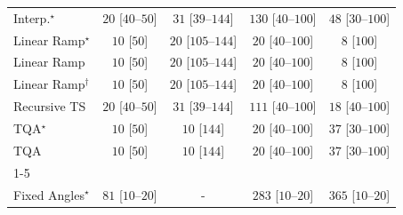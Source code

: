 \begin{tabular}{l|cccc|}
Interp.$^\star$ & {\cellcolor[HTML]{F5FBF2}} \color[HTML]{000000} $20$ [$40$--$50$] & {\cellcolor[HTML]{F3FAF0}} \color[HTML]{000000} $31$ [$39$--$144$] & {\cellcolor[HTML]{DFF3DA}} \color[HTML]{000000} $130$ [$40$--$100$] & {\cellcolor[HTML]{F0F9ED}} \color[HTML]{000000} $48$ [$30$--$100$] \\
Linear Ramp$^\star$ & {\cellcolor[HTML]{F7FCF5}} \color[HTML]{000000} $10$ [$50$] & {\cellcolor[HTML]{F5FBF2}} \color[HTML]{000000} $20$ [$105$--$144$] & {\cellcolor[HTML]{F5FBF2}} \color[HTML]{000000} $20$ [$40$--$100$] & {\cellcolor[HTML]{F7FCF5}} \color[HTML]{000000} $8$ [$100$] \\
Linear Ramp & {\cellcolor[HTML]{F7FCF5}} \color[HTML]{000000} $10$ [$50$] & {\cellcolor[HTML]{F5FBF2}} \color[HTML]{000000} $20$ [$105$--$144$] & {\cellcolor[HTML]{F5FBF2}} \color[HTML]{000000} $20$ [$40$--$100$] & {\cellcolor[HTML]{F7FCF5}} \color[HTML]{000000} $8$ [$100$] \\
Linear Ramp$^\dagger$ & {\cellcolor[HTML]{F7FCF5}} \color[HTML]{000000} $10$ [$50$] & {\cellcolor[HTML]{F5FBF2}} \color[HTML]{000000} $20$ [$105$--$144$] & {\cellcolor[HTML]{F5FBF2}} \color[HTML]{000000} $20$ [$40$--$100$] & {\cellcolor[HTML]{F7FCF5}} \color[HTML]{000000} $8$ [$100$] \\
Recursive TS & {\cellcolor[HTML]{F5FBF2}} \color[HTML]{000000} $20$ [$40$--$50$] & {\cellcolor[HTML]{F3FAF0}} \color[HTML]{000000} $31$ [$39$--$144$] & {\cellcolor[HTML]{E5F5E0}} \color[HTML]{000000} $111$ [$40$--$100$] & {\cellcolor[HTML]{F5FBF3}} \color[HTML]{000000} $18$ [$40$--$100$] \\
TQA$^\star$ & {\cellcolor[HTML]{F7FCF5}} \color[HTML]{000000} $10$ [$50$] & {\cellcolor[HTML]{F7FCF5}} \color[HTML]{000000} $10$ [$144$] & {\cellcolor[HTML]{F5FBF2}} \color[HTML]{000000} $20$ [$40$--$100$] & {\cellcolor[HTML]{F2FAEF}} \color[HTML]{000000} $37$ [$30$--$100$] \\
TQA & {\cellcolor[HTML]{F7FCF5}} \color[HTML]{000000} $10$ [$50$] & {\cellcolor[HTML]{F7FCF5}} \color[HTML]{000000} $10$ [$144$] & {\cellcolor[HTML]{F5FBF2}} \color[HTML]{000000} $20$ [$40$--$100$] & {\cellcolor[HTML]{F2FAEF}} \color[HTML]{000000} $37$ [$30$--$100$] \\
\cline{1-5}
\multicolumn{5}{c}{\rule{0pt}{8pt}SV} \\
\midrule
Fixed Angles$^\star$ & {\cellcolor[HTML]{EAF7E6}} \color[HTML]{000000} $81$ [$10$--$20$] & {\cellcolor[HTML]{000000}} \color[HTML]{F1F1F1} {\cellcolor{white}} \color{black} - & {\cellcolor[HTML]{ACDEA6}} \color[HTML]{000000} $283$ [$10$--$20$] & {\cellcolor[HTML]{8BCF89}} \color[HTML]{000000} $365$ [$10$--$20$] \\

\end{tabular}
